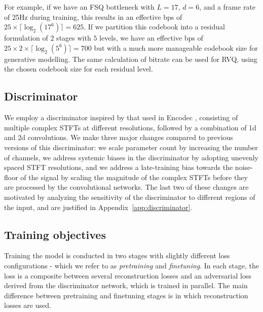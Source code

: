 \documentclass{article} %
\begin{document}
For example, if we have an FSQ bottleneck with $L=17$, $d=6$, and a frame rate of 25Hz during training, this results in an effective bps of $25 \times \lceil \log_2(17^6) \rceil = 625$. If we partition this codebook into a residual formulation of $2$ stages with $5$ levels, we have an effective bps of $25 \times 2 \times \lceil \log_2(5^6) \rceil = 700$ but with a much more manageable codebook size for generative modelling. The same calculation of bitrate can be used for RVQ, using the chosen codebook size for each residual level.



\subsection{Discriminator}
We employ a discriminator inspired by that used in Encodec \citep{défossez2022high}, consisting of multiple complex STFTs at different resolutions, followed by a combination of 1d and 2d convolutions. We make three major changes compared to previous versions of this discriminator: we scale parameter count by increasing the number of channels, we address systemic biases in the discriminator by adopting unevenly spaced STFT resolutions, and we address a late-training bias towards the noise-floor of the signal by scaling the magnitude of the complex STFTs before they are processed by the convolutional networks. The last two of these changes are motivated by analyzing the sensitivity of the discriminator to different regions of the input, and are justified in Appendix~\ref{app:discriminator}.

\subsection{Training objectives}


Training the model is conducted in two stages with slightly different loss configurations - which we refer to as \emph{pretraining} and \emph{finetuning}. In each stage, the loss is a composite between several reconstruction losses and an adversarial loss derived from the discriminator network, which is trained in parallel. The main difference between pretraining and finetuning stages is in which reconstruction losses are used.
\end{document}
